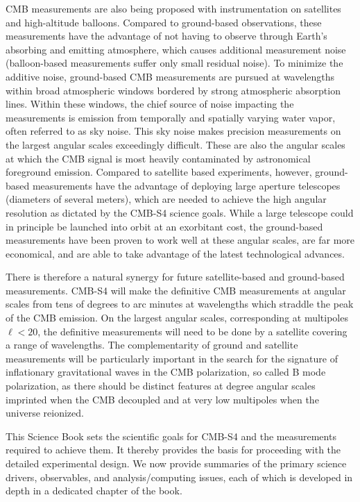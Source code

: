 CMB measurements are also being proposed with instrumentation on satellites and high-altitude balloons. Compared to ground-based observations, these measurements have the advantage of not having to observe through Earth's absorbing and emitting atmosphere, which causes additional measurement noise (balloon-based measurements suffer only small residual noise).
To minimize the additive noise, ground-based CMB measurements are pursued at wavelengths within broad atmospheric windows bordered by strong atmospheric absorption lines. Within these windows, the chief source of noise impacting the measurements is emission from temporally and spatially varying water vapor, often referred to as sky noise. This sky noise makes precision measurements on the largest angular scales exceedingly difficult. These are also the angular scales at which the CMB signal is most heavily contaminated by astronomical foreground emission.
Compared to satellite based experiments, however, ground-based measurements have the advantage of deploying large aperture telescopes (diameters of several meters), which are needed to achieve the high angular resolution as dictated by the CMB-S4 science goals. While a large telescope could in principle be launched into orbit at an exorbitant cost, the ground-based measurements have been proven to work well at these angular scales,  are far more economical, and are able to take advantage of the latest technological advances. 

There is therefore a natural synergy for future satellite-based and ground-based measurements. CMB-S4 will make the definitive CMB measurements at angular scales from tens of degrees to arc minutes at wavelengths which straddle the peak of the CMB emission. On the largest angular scales, corresponding at multipoles $\ell < 20$, the definitive measurements will need to be done by a satellite covering a range of wavelengths.  The complementarity of ground and satellite measurements will be particularly important in the search for the signature of inflationary gravitational waves in the CMB polarization, so called B mode polarization, as there should be distinct features at degree angular scales imprinted when the CMB decoupled and at very low multipoles when the universe reionized. 

This Science Book sets the scientific goals for CMB-S4 and the measurements required to achieve them. It thereby provides the basis for proceeding with the detailed experimental design. We now provide summaries of the primary science drivers, observables, and analysis/computing issues, each of which is developed in depth in a dedicated chapter of the book.

